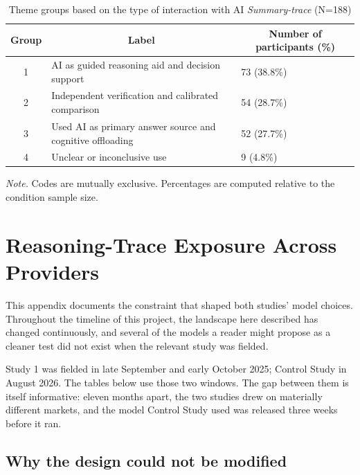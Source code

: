 \documentclass[manuscript,review,anonymous]{acmart}
\begin{document}
\begin{table}[H]
\centering
\caption{Theme groups based on the type of interaction with AI \textit{Summary-trace} (N=188)}
\begin{tabular}{cll}
\hline
Group & \multicolumn{1}{c}{Label}                            & \multicolumn{1}{c}{Number of participants (\%)} \\ \hline
1     & AI as guided reasoning aid and decision support & 73 (38.8\%)                                     \\
2     & Independent verification and calibrated comparison     & 54 (28.7\%)                                     \\
3     &   Used AI as primary answer source and cognitive offloading    & 52 (27.7\%) \\   %
4     & Unclear or inconclusive use              & 9 (4.8\%)  \\           
\hline
\end{tabular}

\raggedright \small \textit{Note.} Codes are mutually exclusive. Percentages are computed relative to the condition sample size.
\label{tab:qualitative_C3}
\end{table}

\section{Reasoning-Trace Exposure Across Providers}\label{sec:provider_landscape}

This appendix documents the constraint that shaped both studies' model choices. Throughout the timeline of this project, the landscape here described has changed
continuously, and several of the models a reader might
propose as a cleaner test did not exist when the relevant study was fielded.

Study 1 was fielded in late September and early October 2025; Control Study in August
2026. The tables below use those two windows. The gap between them is itself
informative: eleven months apart, the two studies drew on materially different
markets, and the model Control Study used was released three weeks before it ran.

\subsection{Why the design could not be modified}
\end{document}
